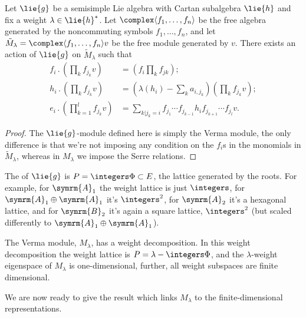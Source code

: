 \documentclass[fleqn]{NotesClass}
\newcommand{\action}{\mathbin{.}}
\newcommand{\dynkin}[2]{\symrm{#1}_{#2}}
\begin{document}
    \begin{prp}{}{}
        Let \(\lie{g}\) be a semisimple Lie algebra with Cartan subalgebra \(\lie{h}\) and fix a weight \(\lambda \in \lie{h}^*\).
        Let \(\complex\langle f_1, \dotsc, f_n \rangle\) be the free algebra generated by the noncommuting symbols \(f_1, \dotsc, f_n\), and let \(\tilde{M}_\lambda = \complex \langle f_1, \dotsc, f_n \rangle v\) be the free module generated by \(v\).
        There exists an action of \(\lie{g}\) on \(\tilde{M}_\lambda\) such that
        \begin{align}
            f_i \action \left( \prod_{k} f_{j_k} v \right) &= \left( f_i\prod_k f_{jk} \right);\\
            h_i \action \left( \prod_k f_{j_k}v \right) &= \left( \lambda(h_i) - \sum_k a_{i,j_k} \right) \left( \prod_k f_{j_k} v \right);\\
            e_i \action \left( \prod_{k=1}^l f_{j_k} v \right) &= \sum_{k | j_k = i} f_{j_1} \dotsm f_{j_{k-1}} h_i f_{j_{k+1}} \dotsm f_{j_l} v.
        \end{align}
        \begin{proof}
            The \(\lie{g}\)-module defined here is simply the Verma module, the only difference is that we're not imposing any condition on the \(f_i\)s in the monomials in \(\tilde{M}_\lambda\), whereas in \(M_\lambda\) we impose the Serre relations.
        \end{proof}
    \end{prp}
    
    The  of \(\lie{g}\) is \(P = \integers \Phi \subset E\), the lattice generated by the roots.
    For example, for \(\dynkin{A}{1}\) the weight lattice is just \(\integers\), for \(\dynkin{A}{1} \oplus \dynkin{A}{1}\) it's \(\integers^2\), for \(\dynkin{A}{2}\) it's a hexagonal lattice, and for \(\dynkin{B}{2}\) it's again a square lattice, \(\integers^2\) (but scaled differently to \(\dynkin{A}{1} \oplus \dynkin{A}{1}\)).
    
    \begin{crl}{}{}
        The Verma module, \(M_\lambda\), has a weight decomposition.
        In this weight decomposition the weight lattice is \(P = \lambda - \integers \Phi\), and the \(\lambda\)-weight eigenspace of \(M_\lambda\) is one-dimensional, further, all weight subspaces are finite dimensional.
    \end{crl}
    
    We are now ready to give the result which links \(M_\lambda\) to the finite-dimensional representations.
    
\end{document}
